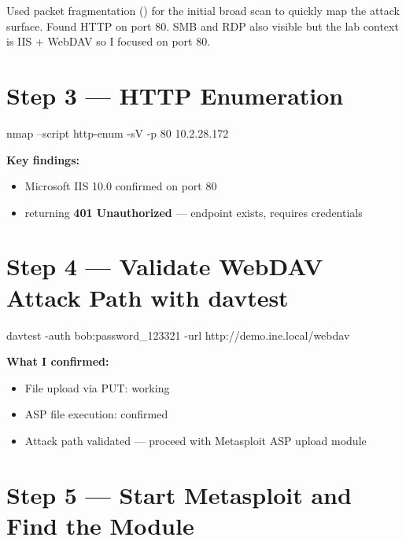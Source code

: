 Used packet fragmentation () for the initial broad scan to quickly map
the attack surface. Found HTTP on port 80. SMB and RDP also visible but the lab
context is IIS + WebDAV so I focused on port 80.


\section*{Step 3 --- HTTP Enumeration}

\begin{termbox}
nmap --script http-enum -sV -p 80 10.2.28.172
\end{termbox}

\textbf{Key findings:}
\begin{itemize}
  \item Microsoft IIS 10.0 confirmed on port 80
  \item {} returning \textbf{401 Unauthorized} --- endpoint exists,
        requires credentials
\end{itemize}


\section*{Step 4 --- Validate WebDAV Attack Path with davtest}

\begin{termbox}
davtest -auth bob:password_123321 -url http://demo.ine.local/webdav
\end{termbox}

\textbf{What I confirmed:}
\begin{itemize}
  \item File upload via PUT: working
  \item ASP file execution: confirmed
  \item Attack path validated --- proceed with Metasploit ASP upload module
\end{itemize}

\section*{Step 5 --- Start Metasploit and Find the Module}

